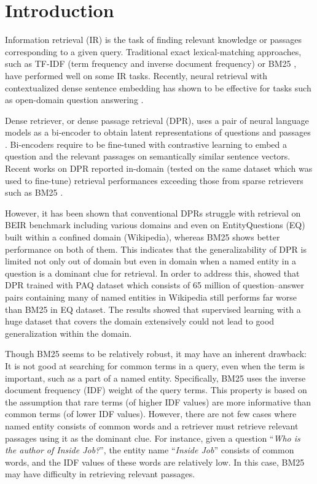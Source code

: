 \documentclass[letterpaper]{article} %
\begin{document}
\section{Introduction}
Information retrieval (IR) is the task of finding relevant knowledge or passages corresponding to a given query.
Traditional exact lexical-matching approaches, such as TF-IDF (term frequency and inverse document frequency) or BM25 \citep{robertson1995okapi, robertson2009probabilistic}, have performed well on some IR tasks.
Recently, neural retrieval with contextualized dense sentence embedding has shown to be effective for tasks such as open-domain question answering \citep[e.g.,][]{karpukhin-etal-2020-dense,xiong2021approximate}.

Dense retriever, or dense passage retrieval (DPR), uses a pair of neural language models as a bi-encoder to obtain latent representations of questions and passages \citep{lee-etal-2019-latent}.
Bi-encoders require to be fine-tuned with contrastive learning to embed a question and the relevant passages on semantically similar sentence vectors.
Recent works on DPR reported in-domain (tested on the same dataset which was used to fine-tune) retrieval performances exceeding those from sparse retrievers such as BM25 \citep{karpukhin-etal-2020-dense}.

However, it has been shown that conventional DPRs struggle with retrieval on BEIR benchmark \citep{thakur2021beir} including various domains and even on EntityQuestions (EQ) \citep{sciavolino-etal-2021-simple} built within a confined domain (Wikipedia), whereas BM25 shows better performance on both of them.
This indicates that the generalizability of DPR is limited not only out of domain but even in domain when a named entity in a question is a dominant clue for retrieval.
In order to address this, \citet{sciavolino-etal-2021-simple} showed that DPR trained with PAQ dataset \citep{lewis-etal-2021-paq} which consists of 65 million of question--answer pairs containing many of named entities in Wikipedia still performs far worse than BM25 in EQ dataset.
The results showed that supervised learning with a huge dataset that covers the domain extensively could not lead to good generalization within the domain.

Though BM25 seems to be relatively robust, it may have an inherent drawback:
It is not good at searching for common terms in a query, even when the term is important, such as a part of a named entity.
Specifically, BM25 uses the inverse document frequency (IDF) weight of the query terms.
This property is based on the assumption that rare terms (of higher IDF values) are more informative than common terms (of lower IDF values).
However, there are not few cases where named entity consists of common words and a retriever must retrieve relevant passages using it as the dominant clue.
For instance, given a question ``\textit{Who is the author of Inside Job?}'', the entity name ``\textit{Inside Job}'' consists of common words, and the IDF values of these words are relatively low.
In this case, BM25 may have difficulty in retrieving relevant passages.
\end{document}
